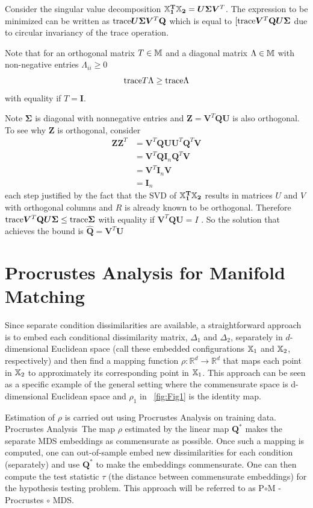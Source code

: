 \documentclass[12pt,oneside,final]{thesis}\usepackage[]{graphicx}\usepackage[]{color}
\begin{document}
 Consider the singular value decomposition $\mathbf{{\mathbb{X}}_1^T {\mathbb{X}}_2}=\bm{U} \bm{\Sigma} \bm{V}^T$. The expression to be minimized can be written as $\textup{trace} {\bm{U} \bm{\Sigma} \bm{V}^T \mathbf{Q}}$ which is equal to  $[\textup{trace} { \bm{V}^T \mathbf{Q} \bm{U} \bm{\Sigma}} $ due to circular invariancy of the trace operation.
 
 Note that for an orthogonal matrix $T\in \mathbb{M}$ and a diagonal matrix $\Lambda \in \mathbb{M}$ with non-negative entries $\Lambda_{ii}\geq 0$
 \[
 \textup{trace}{ T \Lambda } \geq \textup{trace}{ \Lambda} \] with equality if $T=\bm{I}$.
 
 Note $\bm{\Sigma}$ is diagonal with nonnegative entries  and $\bm{Z}=\bm{V}^T \mathbf{Q} \bm{U}$ is also orthogonal. To see why $\bm{Z}$ is orthogonal, consider 
 \begin{align*}
 \bm{Z}\bm{Z}^T &= \bm{V}^T \mathbf{Q} \bm{U} \bm{U}^T \mathbf{Q}^T  \bm{V} \\
 &= \bm{V}^T \mathbf{Q} \bm{I}_n \mathbf{Q}^T  \bm{V}\\
 &= \bm{V}^T \bm{I}_n  \bm{V} \\
 &= \bm{I}_n
 \end{align*} 
 each step justified by the fact that the SVD of $\mathbf{{\mathbb{X}}_1^T {\mathbb{X}}_2}$ results in matrices  $U$ and $V$ with orthogonal columns and $R$ is already known to be orthogonal.
 Therefore  $\textup{trace} { \bm{V}^T \mathbf{Q} \bm{U} \bm{\Sigma}}  \leq \textup{trace} \bm{\Sigma}$ 
with equality if  $\bm{V}^T \mathbf{Q} \bm{U} = I$ . So the solution  that achieves the bound is $\hat{\mathbf{Q}}= \bm{V}^T  \bm{U}$

\section{Procrustes Analysis for Manifold Matching}

Since separate  condition dissimilarities are available, a straightforward approach is to embed each conditional dissimilarity matrix, $\Delta_1$ and $\Delta_2$, separately  in  $d$-dimensional Euclidean space (call these embedded configurations ${\mathbb{X}}_1$ and ${\mathbb{X}}_2$, respectively) and then find a mapping function $\rho :\mathbb{R}^{d}\rightarrow\mathbb{R}^{d}$ that maps each point in ${\mathbb{X}}_2$ to approximately its corresponding point in ${\mathbb{X}}_1$. This approach can be seen as a specific example of the general setting where the commensurate space is d-dimensional  Euclidean space and $\rho_1$ in  ~\ref{fig:Fig1} is the identity map. 

Estimation of $\rho$ is carried out using  Procrustes Analysis  on training data. Procrustes Analysis~The map $\rho$ estimated by the linear map $\mathbf{Q}^*$   makes the separate MDS embeddings as commensurate as possible. Once such a mapping is computed, one can out-of-sample embed  new dissimilarities for each condition (separately)  and  use $\mathbf{Q}^*$ to make the embeddings commensurate.
One can then compute the test statistic $\tau$ (the distance between commensurate embeddings) for  the hypothesis testing problem. This approach will be referred to  as P$\circ$M - Procrustes $\circ$ MDS.
\end{document}
